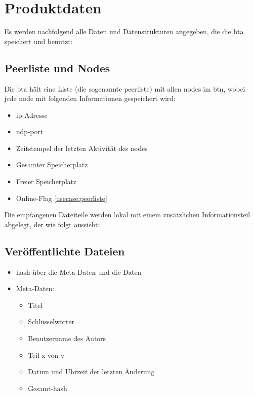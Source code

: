 \section{Produktdaten}
Es werden nachfolgend alle Daten und Datenstrukturen angegeben, die die \gls{bta} speichert und benutzt:

\subsection{Peerliste und Nodes}
Die \gls{bta} hält eine Liste (die sogenannte \gls{peerliste}) mit allen \gls{node}s im \gls{btn}, wobei jede \gls{node} mit folgenden Informationen gespeichert wird:
\begin{itemize}
	\item \gls{ip}-Adresse
	\item \gls{udp}-\gls{port}
	\item Zeitstempel der letzten Aktivität des \gls{node}s
	\item Gesamter Speicherplatz
	\item Freier Speicherplatz
	\item Online-Flag \ref{usecase:peerliste}
\end{itemize}

{\Large Die empfangenen Dateiteile werden lokal mit einem zusätzlichen Informationsteil abgelegt, der wie folgt aussieht}:

\subsection{Veröffentlichte Dateien}
\begin{itemize}
	\item \gls{hash} \"uber die Meta-Daten und die Daten
	\item Meta-Daten:
	\begin{itemize}
		\item Titel
		\item Schl\"usselw\"orter
		\item Benutzername des Autors
		\item Teil x von y
		\item Datum und Uhrzeit der letzten \"Anderung
		\item Gesamt-\gls{hash}
	\end{itemize}
\end{itemize}

\newpage

